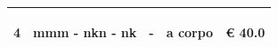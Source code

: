 \documentclass[a4paper]{article}
\begin{document}
\begin{tabular}{ | L{10mm} |  L{86mm} | L{12mm} | L{12mm} | L{16mm} | }
                            
                              \vspace{2.5mm}
                              \begin{spacing}{0}
                           4
                              \end{spacing} &
                              \vspace{2.5mm}
                              \begin{spacing}{0}
                           mmm - nkn - nk
                              \end{spacing} &
                              \vspace{2.5mm}
                              \begin{spacing}{0}
                           -
                              \end{spacing} &
                              \vspace{2.5mm}
                              \begin{spacing}{0}
                           a corpo
                              \end{spacing} &
                              \vspace{2.5mm}
                              \begin{spacing}{0}
                                \euro\hfill 
                            40.0
                              \end{spacing} \\
                              \hline

                            
                          \end{tabular}
\end{document}
